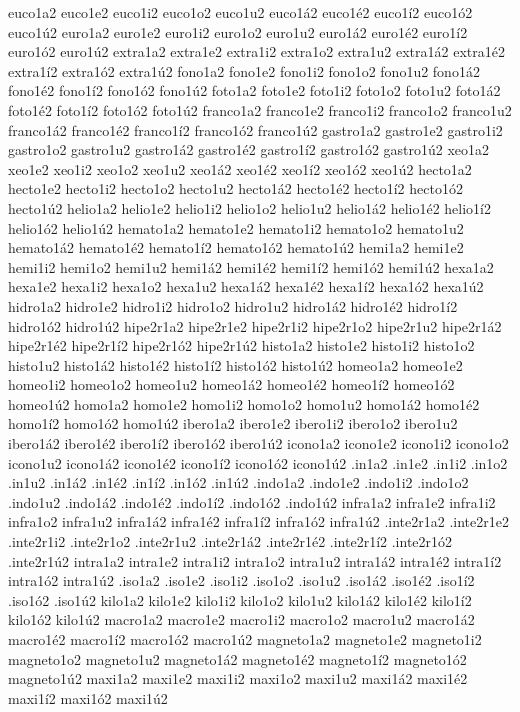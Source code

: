 {euco1a2 euco1e2 euco1i2 euco1o2 euco1u2 euco1á2 euco1é2 euco1í2 euco1ó2 euco1ú2
euro1a2 euro1e2 euro1i2 euro1o2 euro1u2 euro1á2 euro1é2 euro1í2 euro1ó2 euro1ú2
extra1a2 extra1e2 extra1i2 extra1o2 extra1u2 extra1á2 extra1é2 extra1í2 extra1ó2 extra1ú2
fono1a2 fono1e2 fono1i2 fono1o2 fono1u2 fono1á2 fono1é2 fono1í2 fono1ó2 fono1ú2
foto1a2 foto1e2 foto1i2 foto1o2 foto1u2 foto1á2 foto1é2 foto1í2 foto1ó2 foto1ú2
franco1a2 franco1e2 franco1i2 franco1o2 franco1u2 franco1á2 franco1é2 franco1í2 franco1ó2 franco1ú2
gastro1a2 gastro1e2 gastro1i2 gastro1o2 gastro1u2 gastro1á2 gastro1é2 gastro1í2 gastro1ó2 gastro1ú2
xeo1a2 xeo1e2 xeo1i2 xeo1o2 xeo1u2 xeo1á2 xeo1é2 xeo1í2 xeo1ó2 xeo1ú2
hecto1a2 hecto1e2 hecto1i2 hecto1o2 hecto1u2 hecto1á2 hecto1é2 hecto1í2 hecto1ó2 hecto1ú2
helio1a2 helio1e2 helio1i2 helio1o2 helio1u2 helio1á2 helio1é2 helio1í2 helio1ó2 helio1ú2
hemato1a2 hemato1e2 hemato1i2 hemato1o2 hemato1u2 hemato1á2 hemato1é2 hemato1í2 hemato1ó2 hemato1ú2
hemi1a2 hemi1e2 hemi1i2 hemi1o2 hemi1u2 hemi1á2 hemi1é2 hemi1í2 hemi1ó2 hemi1ú2
hexa1a2 hexa1e2 hexa1i2 hexa1o2 hexa1u2 hexa1á2 hexa1é2 hexa1í2 hexa1ó2 hexa1ú2
hidro1a2 hidro1e2 hidro1i2 hidro1o2 hidro1u2 hidro1á2 hidro1é2 hidro1í2 hidro1ó2 hidro1ú2
hipe2r1a2 hipe2r1e2 hipe2r1i2 hipe2r1o2 hipe2r1u2 hipe2r1á2 hipe2r1é2 hipe2r1í2 hipe2r1ó2 hipe2r1ú2
histo1a2 histo1e2 histo1i2 histo1o2 histo1u2 histo1á2 histo1é2 histo1í2 histo1ó2 histo1ú2
homeo1a2 homeo1e2 homeo1i2 homeo1o2 homeo1u2 homeo1á2 homeo1é2 homeo1í2 homeo1ó2 homeo1ú2
homo1a2 homo1e2 homo1i2 homo1o2 homo1u2 homo1á2 homo1é2 homo1í2 homo1ó2 homo1ú2
ibero1a2 ibero1e2 ibero1i2 ibero1o2 ibero1u2 ibero1á2 ibero1é2 ibero1í2 ibero1ó2 ibero1ú2
icono1a2 icono1e2 icono1i2 icono1o2 icono1u2 icono1á2 icono1é2 icono1í2 icono1ó2 icono1ú2
.in1a2 .in1e2 .in1i2 .in1o2 .in1u2 .in1á2 .in1é2 .in1í2 .in1ó2 .in1ú2
.indo1a2 .indo1e2 .indo1i2 .indo1o2 .indo1u2 .indo1á2 .indo1é2 .indo1í2 .indo1ó2 .indo1ú2
infra1a2 infra1e2 infra1i2 infra1o2 infra1u2 infra1á2 infra1é2 infra1í2 infra1ó2 infra1ú2
.inte2r1a2 .inte2r1e2 .inte2r1i2 .inte2r1o2 .inte2r1u2 .inte2r1á2 .inte2r1é2 .inte2r1í2 .inte2r1ó2 .inte2r1ú2
intra1a2 intra1e2 intra1i2 intra1o2 intra1u2 intra1á2 intra1é2 intra1í2 intra1ó2 intra1ú2
.iso1a2 .iso1e2 .iso1i2 .iso1o2 .iso1u2 .iso1á2 .iso1é2 .iso1í2 .iso1ó2 .iso1ú2
kilo1a2 kilo1e2 kilo1i2 kilo1o2 kilo1u2 kilo1á2 kilo1é2 kilo1í2 kilo1ó2 kilo1ú2
macro1a2 macro1e2 macro1i2 macro1o2 macro1u2 macro1á2 macro1é2 macro1í2 macro1ó2 macro1ú2
magneto1a2 magneto1e2 magneto1i2 magneto1o2 magneto1u2 magneto1á2 magneto1é2 magneto1í2 magneto1ó2 magneto1ú2
maxi1a2 maxi1e2 maxi1i2 maxi1o2 maxi1u2 maxi1á2 maxi1é2 maxi1í2 maxi1ó2 maxi1ú2
}
